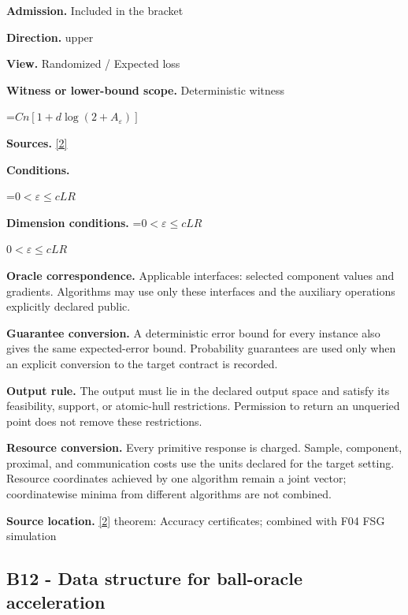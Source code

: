 \documentclass[10pt,a4paper]{article}
\newcommand{\AtlasMath}[1]{\par\begingroup\centering\setbox0=\hbox{$\displaystyle #1$}\ifdim\wd0>1.4\linewidth\typeout{ATLAS WIDE FORMULA: \the\wd0}\fi\ifdim\wd0>\linewidth\resizebox{\linewidth}{!}{\box0}\else\box0\fi\par\endgroup}
\newcommand{\AtlasInlineMath}[1]{\begingroup\setbox0=\hbox{$#1$}\ifdim\wd0>.4\linewidth\endgroup\AtlasMath{#1}\else\endgroup$#1$\fi}
\begin{document}
\textbf{Admission.} Included in the bracket



\textbf{Direction.} upper



\textbf{View.} Randomized / Expected loss



\textbf{Witness or lower-bound scope.} Deterministic witness



\AtlasMath{Cn[1+d\log(2+A_\varepsilon)]}


\textbf{Sources.} \href{https://www2.isye.gatech.edu/~nemirovs/MOR_AccuracyCertificates.pdf}{[2]}



\textbf{Conditions.}
\AtlasMath{0<\varepsilon\le cLR}




\textbf{Dimension conditions.} \AtlasInlineMath{0<\varepsilon\le cLR}



\textbf{Oracle correspondence.} Applicable interfaces: selected component values and gradients. Algorithms may use only these interfaces and the auxiliary operations explicitly declared public.



\textbf{Guarantee conversion.} A deterministic error bound for every instance also gives the same expected-error bound. Probability guarantees are used only when an explicit conversion to the target contract is recorded.



\textbf{Output rule.} The output must lie in the declared output space and satisfy its feasibility, support, or atomic-hull restrictions. Permission to return an unqueried point does not remove these restrictions.



\textbf{Resource conversion.} Every primitive response is charged. Sample, component, proximal, and communication costs use the units declared for the target setting. Resource coordinates achieved by one algorithm remain a joint vector; coordinatewise minima from different algorithms are not combined.



\textbf{Source location.} \href{https://www2.isye.gatech.edu/~nemirovs/MOR_AccuracyCertificates.pdf}{[2]} theorem: Accuracy certificates; combined with F04 FSG simulation



\subsection{B12 - Data structure for ball-oracle acceleration}
\end{document}
